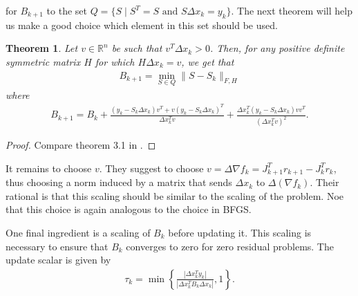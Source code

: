 \documentclass{article}
\theoremstyle{plain}%
\newtheorem{thm}{Theorem}[section]
\theoremstyle{definition}
\begin{document}
for $B_{k+1}$ to the set $Q=\{S\; | \; S^T=S \textrm{ and } S\Delta x_k=y_k \}$. The next theorem
will help us make a good choice  which element in this set should be used. 
\begin{thm}
  Let $v \in \mathbb{R}^n$ be such that $v^T \Delta x_k >0$. Then, for any positive definite
symmetric matrix $H$ for which $H \Delta x_k=v$, we get that 
\begin{align}
  B_{k+1}=\min_{S \in Q} \|S-S_k \|_{F,H}
\end{align}
where 
\begin{align*}
  B_{k+1}=B_k+ \frac{(y_k-S_k\Delta x_k)v^T+ v(y_k-S_k\Delta x_k)^T}{\Delta x_k^T v}
+ \frac{\Delta x_k^T(y_k-S_k \Delta x_k)v v^T}{\left(\Delta x_k^T v\right)^2}.
\end{align*}
\end{thm}
\begin{proof}
  Compare theorem 3.1 in \cite{Dennis1981}.
\end{proof}
It remains to choose $v$. They suggest to choose $v=\Delta \nabla f_k= J^T_{k+1}r_{k+1}-J_k^Tr_{k}$, thus choosing
a norm induced by a matrix that sends $\Delta x_k$ to $\Delta \left(\nabla f_k\right)$. Their rational is that
this scaling should be similar to the scaling of the problem. Noe that this choice is again analogous to
the choice in BFGS. \par
One final ingredient is a scaling of $B_k$ before updating it. This scaling is necessary to ensure
that  $B_k$ converges to zero for zero residual problems. The update scalar is given by 
\begin{align*}
  \tau_k=\min \left \{  \frac{|\Delta x_k^T y_k|}{|\Delta x_k^T B_k \Delta x_k|} ,1   \right \}.
\end{align*}
\end{document}

